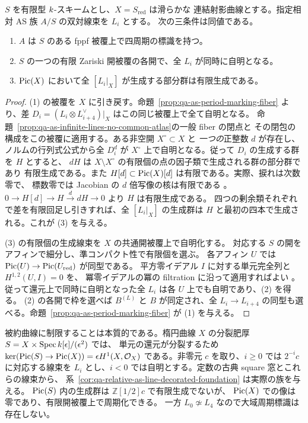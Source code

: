 \begin{corollary}[射影曲線の冪零肥厚上の局所四周期化]
\label{cor:qa-curve-local-period-criterion}
$S$ を有限型 $k$-スキームとし、$X=S_{\mathrm{red}}$ は滑らかな
連結射影曲線とする。指定相対 AS 族 $A/S$ の双対線束を $L_i$ とする。
次の三条件は同値である。
\begin{enumerate}
\item $A$ は $S$ のある fppf 被覆上で四周期の標識を持つ。
\item $S$ の一つの有限 Zariski 開被覆の各開で、全 $L_i$ が同時に自明となる。
\item $\operatorname{Pic}(X)$ において全 $[L_i|_X]$ が生成する部分群は有限生成である。
\end{enumerate}
\end{corollary}
\begin{proof}
(1) の被覆を $X$ に引き戻す。命題~\ref{prop:qa-as-period-marking-fiber}
より、差 $D_i=(L_i\otimes L_{i+4}^\vee)|_X$ はこの同じ被覆上で全て自明となる。
命題~\ref{prop:qa-as-infinite-lines-no-common-atlas}の一般 fiber の閉点と
その閉包の構成をこの被覆に適用する。ある非空開 $X^\circ\subset X$ と
\emph{一つの}正整数 $d$ が存在し、ノルムの行列式公式から全 $D_i^d$ が
$X^\circ$ 上で自明となる。従って $D_i$ の生成する群を $H$ とすると、
$dH$ は $X\setminus X^\circ$ の有限個の点の因子類で生成される群の部分群であり
有限生成である。また $H[d]\subset\operatorname{Pic}(X)[d]$ は有限である。実際、捩れは次数零で、
標数零では Jacobian の $d$ 倍写像の核は有限である
\cite[Tag 03RN]{StacksCurvePicardAudit}。
$0\to H[d]\to H\xrightarrow{d}dH\to0$ より $H$ は有限生成である。
四つの剰余類それぞれで差を有限回足し引きすれば、全 $[L_i|_X]$ の生成群は
$H$ と最初の四本で生成される。これが (3) を与える。

(3) の有限個の生成線束を $X$ の共通開被覆上で自明化する。
対応する $S$ の開をアフィンで細分し、準コンパクト性で有限個を選ぶ。
各アフィン $U$ では $\operatorname{Pic}(U)\to\operatorname{Pic}(U_{\mathrm{red}})$ が同型である。
平方零イデアル $I$ に対する単元完全列と $H^{1,2}(U,I)=0$ を、
冪零イデアルの冪の filtration に沿って適用すればよい
\cite[Lemma 37.4.1]{StacksCurvePicardAudit}。
従って還元上で同時に自明となった全 $L_i$ は各 $U$ 上でも自明であり、(2) を得る。
(2) の各開で枠を選べば $B^{(L)}$ と $B$ が同定され、全 $L_i\to L_{i+4}$
の同型も選べる。命題~\ref{prop:qa-as-period-marking-fiber} が (1) を与える。
\end{proof}

被約曲線に制限することは本質的である。楕円曲線 $X$ の分裂肥厚
$S=X\times\operatorname{Spec}k[\epsilon]/(\epsilon^2)$ では、
単元の還元が分裂するため $\ker(\operatorname{Pic}(S)\to\operatorname{Pic}(X))=\epsilon H^1(X,\mathcal O_X)$
である。非零元 $c$ を取り、$i\ge0$ では $2^{-i}c$ に対応する線束を
$L_i$ とし、$i<0$ では自明とする。定数の古典 square 窓とこれらの線束から、
系~\ref{cor:qa-relative-as-line-decorated-foundation} は実際の族を与える。
$\operatorname{Pic}(S)$ 内の生成群は $\mathbb Z[1/2]c$ で有限生成でないが、
$\operatorname{Pic}(X)$ での像は零であり、有限開被覆上で周期化できる。
一方 $L_0\not\simeq L_4$ なので大域周期標識は存在しない。


